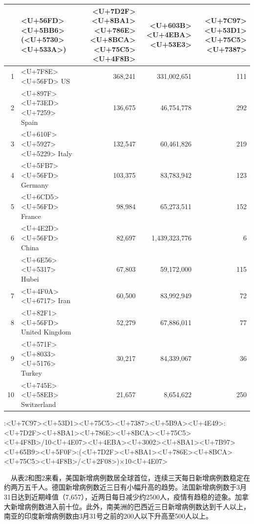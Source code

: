 \documentclass[
]{article}
\begin{document}
\begin{table}[H]
    \caption{<U+7D2F><U+8BA1><U+786E><U+8BCA><U+524D><U+5341><U+4F4D><U+56FD><U+5BB6>}
      \vspace{-0.5\baselineskip}
      \centering \begin{table}[H]
\centering
\begin{tabular}{rlrrr}
\toprule
  & <U+56FD><U+5BB6>(<U+5730><U+533A>) & <U+7D2F><U+8BA1><U+786E><U+8BCA><U+75C5><U+4F8B> & <U+603B><U+4EBA><U+53E3> & <U+7C97><U+53D1><U+75C5><U+7387>\\
\midrule
\rowcolor{gray!6}  1 & <U+7F8E><U+56FD> US & 368,241 & 331,002,651 & 111\\
2 & <U+897F><U+73ED><U+7259> Spain & 136,675 & 46,754,778 & 292\\
\rowcolor{gray!6}  3 & <U+610F><U+5927><U+5229> Italy & 132,547 & 60,461,826 & 219\\
4 & <U+5FB7><U+56FD> Germany & 103,375 & 83,783,942 & 123\\
\rowcolor{gray!6}  5 & <U+6CD5><U+56FD> France & 98,984 & 65,273,511 & 152\\
6 & <U+4E2D><U+56FD> China & 82,697 & 1,439,323,776 & 6\\
\rowcolor{gray!6}   & <U+6E56><U+5317> Hubei & 67,803 & 59,172,000 & 115\\
7 & <U+4F0A><U+6717> Iran & 60,500 & 83,992,949 & 72\\
\rowcolor{gray!6}  8 & <U+82F1><U+56FD> United Kingdom & 52,279 & 67,886,011 & 77\\
9 & <U+571F><U+8033><U+5176> Turkey & 30,217 & 84,339,067 & 36\\
\rowcolor{gray!6}  10 & <U+745E><U+58EB> Switzerland & 21,657 & 8,654,622 & 250\\
\bottomrule
\end{tabular}
\end{table} \begin{tablenotes}
        \footnotesize
        \item <U+6CE8>:<U+7C97><U+53D1><U+75C5><U+7387><U+5B9A><U+4E49>:<U+7D2F><U+8BA1><U+786E><U+8BCA><U+75C5><U+4F8B>/10<U+4E07><U+4EBA><U+3002><U+8BA1><U+7B97><U+65B9><U+5F0F>:(<U+7D2F><U+8BA1><U+786E><U+8BCA><U+75C5><U+4F8B>/<U+2F08>)×10<U+4E07>  %
      \end{tablenotes}
    \end{table}

\newpage

~~从表2和图2来看，美国新增病例数居全球首位，连续三天每日新增病例数稳定在约两万五千人。德国新增病例数近三日有小幅升高的趋势。法国新增病例数于3月31日达到近期峰值（7,657），近两日每日减少约2500人，疫情有趋稳的迹象。加拿大新增病例数进入前十位。此外，南美洲的巴西近三日新增病例数达到千人以上，南亚的印度新增病例数由3月31号之前的200人以下升高至500人以上。
\end{document}
